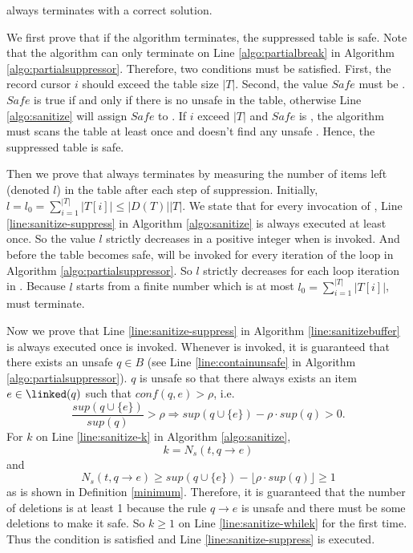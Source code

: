 \begin{theorem}
\label{CorrectnessOfPartialSuppressor}
  \PartialSuppressor always terminates with a correct solution.
\end{theorem}
\begin{pf}
We first prove that if the algorithm terminates, the suppressed table is safe.
Note that the algorithm can only terminate on Line \ref{algo:partialbreak}
  in Algorithm \ref{algo:partialsuppressor}.
  Therefore, two conditions must be satisfied. First, the record cursor 
$i$ should exceed the table size $|T|$. Second, the value $Safe$ must be \TRUE. 
$Safe$ is true if and only if there is no unsafe \qids in the table, otherwise  Line \ref{algo:sanitize}
 will assign $Safe$ to \FALSE. If $i$ exceed $|T|$ and $Safe$ is \TRUE, the algorithm
must scans the table at least once and doesn't find any unsafe \qids. Hence, the
 suppressed table is safe.


Then we prove that \PartialSuppressor always terminates by measuring the
  number of items left (denoted $l$) in the table after each step of suppression.
Initially, $l=l_0=\sum_{i=1}^{|T|} |T[i]|\le |D(T)| |T|$.
We state that for every invocation of \SanitizeBuffer, Line \ref{line:sanitize-suppress}
  in Algorithm \ref{algo:sanitize} is always executed at least once.
So the value $l$ strictly decreases in a positive integer
when \SanitizeBuffer is invoked.
And before the table becomes safe, \SanitizeBuffer will be invoked for
  every iteration of the loop in Algorithm \ref{algo:partialsuppressor}.
So $l$ strictly decreases for each loop iteration in \PartialSuppressor.
Because $l$ starts from a finite number which is at most $l_0=\sum_{i=1}^{|T|} |T[i]|$,
  \PartialSuppressor must terminate.

Now we prove that Line \ref{line:sanitize-suppress} in Algorithm \ref{line:sanitizebuffer}
  is always executed once \SanitizeBuffer is invoked.
Whenever \SanitizeBuffer is invoked, it is guaranteed that there exists
  an unsafe \qid $q\in B$ (see Line \ref{line:containunsafe}  in Algorithm \ref{algo:partialsuppressor}).
$q$ is unsafe so that there always exists an item $e\in\linked(q)$ such that $conf(q,e)>\rho$,
  i.e. \[ \frac{sup(q\cup\{e\})}{sup(q)}>\rho \Rightarrow
   sup(q\cup\{e\})-\rho\cdot sup(q)>0 .\]
For $k$ on Line \ref{line:sanitize-k} in Algorithm \ref{algo:sanitize},
  \[ k = N_s(t, q\rightarrow e)\]
  and
  \[N_s(t, q\rightarrow e) \geq sup(q\cup\{e\})-\lfloor\rho\cdot sup(q)\rfloor \ge 1\]
  as is shown in Definition \ref{minimum}. Therefore,
  it is guaranteed that the number of deletions is at least 1
  because the rule $q\rightarrow e$ is unsafe and there must be some deletions to make it safe.
So $k\ge 1$ on Line \ref{line:sanitize-whilek} for the first time.
Thus the condition is satisfied and Line \ref{line:sanitize-suppress} is executed.
\end{pf}

